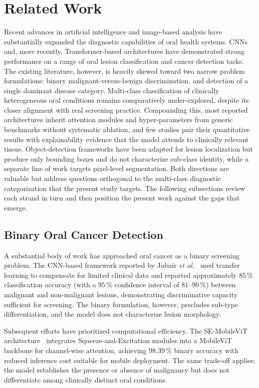\section{Related Work}\label{sec:related}

Recent advances in artificial intelligence and image-based analysis have
substantially expanded the diagnostic capabilities of oral health systems.
CNNs and, more recently, Transformer-based architectures have demonstrated
strong performance on a range of oral lesion classification and cancer
detection tasks. The existing literature, however, is heavily skewed toward two
narrow problem formulations: binary malignant-versus-benign discrimination, and
detection of a single dominant disease category. Multi-class classification of
clinically heterogeneous oral conditions remains comparatively under-explored,
despite its closer alignment with real screening practice. Compounding this,
most reported architectures inherit attention modules and hyper-parameters from
generic benchmarks without systematic ablation, and few studies pair their
quantitative results with explainability evidence that the model attends to
clinically relevant tissue. Object-detection frameworks have been adapted for
lesion localization but produce only bounding boxes and do not characterize
sub-class identity, while a separate line of work targets pixel-level
segmentation. Both directions are valuable but address questions
orthogonal to the multi-class diagnostic categorization that the present study
targets. The following subsections review each strand in turn and then
position the present work against the gaps that emerge.

\subsection{Binary Oral Cancer Detection}

A substantial body of work has approached oral cancer as a binary screening
problem. The CNN-based framework reported by Jubair \emph{et al.}~\cite{ref5}
used transfer learning to compensate for limited clinical data and reported
approximately $85\,\%$ classification accuracy (with a $95\,\%$ confidence
interval of $81$--$90\,\%$) between malignant and non-malignant lesions,
demonstrating discriminative capacity sufficient for screening. The binary
formulation, however, precludes sub-type differentiation, and the model does
not characterize lesion morphology.

Subsequent efforts have prioritized computational efficiency. The SE-MobileViT
architecture~\cite{ref16} integrates Squeeze-and-Excitation modules into a
MobileViT backbone for channel-wise attention, achieving $98.39\,\%$ binary
accuracy with reduced inference cost suitable for mobile deployment. The same
trade-off applies: the model establishes the presence or absence of malignancy
but does not differentiate among clinically distinct oral conditions.


